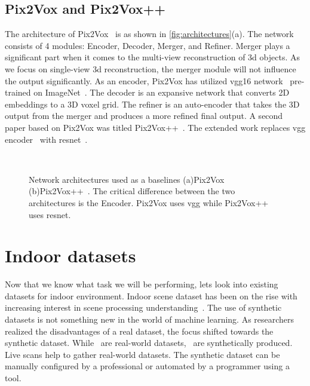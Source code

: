 \subsection{Pix2Vox and Pix2Vox++}\label{subsec:pix2vox-and-pix2vox++}
The architecture of Pix2Vox~\cite{Xie_2019} is as shown in \autoref{fig:architectures}(a).
The network consists of 4 modules: Encoder, Decoder, Merger, and Refiner.
Merger plays a significant part when it comes to the multi-view reconstruction of 3d objects.
As we focus on single-view 3d reconstruction, the merger module will not influence the output significantly.
As an encoder, Pix2Vox has utilized \gls{vgg}16 network~\cite{simonyan2015deep} pre-trained on ImageNet~\cite{Deng2009ImageNetAL}.
The decoder is an expansive network that converts 2D embeddings to a 3D voxel grid.
The refiner is an auto-encoder that takes the 3D output from the merger and produces a more refined final output.
A second paper based on Pix2Vox was titled Pix2Vox++~\cite{Xie_2020}.
The extended work replaces \gls{vgg} encoder~\cite{simonyan2015deep} with \gls{resnet}~\cite{He2016DeepRL}.

\begin{figure}[!ht]
    \centering
    \quad
    \\
    \caption{Network architectures used as a baselines (a)Pix2Vox~\cite{Xie_2019} (b)Pix2Vox++~\cite{Xie_2020}.
    The critical difference between the two architectures is the Encoder. Pix2Vox uses \gls{vgg} while Pix2Vox++ uses \gls{resnet}.}
    \label{fig:architectures}
\end{figure}

\section{Indoor datasets}\label{sec:indoor-dataset}

Now that we know what task we will be performing, lets look into existing datasets for indoor environment.
Indoor scene dataset has been on the rise with increasing interest in scene processing understanding~\cite{Dai2017,Silberman2012,Xiao2013SUN3DAD,Hua2016SceneNNAS,Armeni20163DSP,Chang2018,Handa2016UnderstandingRI,InteriorNet18,Li_2021_CVPR,zheng2020structured3d,Roberts2020HypersimAP,McCormac2017}.
The use of synthetic datasets is not something new in the world of machine learning.
As researchers realized the disadvantages of a real dataset, the focus shifted towards the synthetic dataset.
While~\cite{Dai2017, Lim2013, Sun2018} are real-world datasets,~\cite{Fu20203DFRONT3F,Handa2016UnderstandingRI,McCormac2017,Roberts2020HypersimAP} are synthetically produced.
Live scans help to gather real-world datasets.
The synthetic dataset can be manually configured by a professional or automated by a programmer using a tool.

